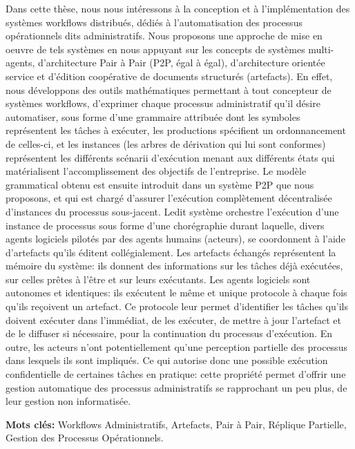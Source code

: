 \let\oldprintchaptertitle=\printchaptertitle
\renewcommand{\printchaptertitle}[1]{%
	\vspace*{-75pt}
	\oldprintchaptertitle{#1}
}%
\let\printchaptertitle=\oldprintchaptertitle
Dans cette thèse, nous nous intéressons à la conception et à l'implémentation des systèmes workflows distribués, dédiés à l'automatisation des processus opérationnels dits administratifs. Nous proposons une approche de mise en oeuvre de tels systèmes en nous appuyant sur les concepts de systèmes multi-agents, d'architecture Pair à Pair (P2P, égal à égal), d'architecture orientée service et d'édition coopérative de documents structurés (artefacts). 
En effet, nous développons des outils mathématiques permettant à tout concepteur de systèmes workflows, d'exprimer chaque processus administratif qu'il désire automatiser, sous forme d'une grammaire attribuée dont les symboles représentent les tâches à exécuter, les productions spécifient un ordonnancement de celles-ci, et les instances (les arbres de dérivation qui lui sont conformes) représentent les différents scénarii d'exécution menant aux différents états qui matérialisent l'accomplissement des objectifs de l'entreprise. Le modèle grammatical obtenu est ensuite introduit dans un système P2P que nous proposons, et qui est chargé d'assurer l'exécution complètement décentralisée d'instances du processus sous-jacent. 
Ledit système orchestre l'exécution d'une instance de processus sous forme d'une chorégraphie durant laquelle, divers agents logiciels pilotés par des agents humains (acteurs), se coordonnent à l'aide d'artefacts qu'ils éditent collégialement. Les artefacts échangés représentent la mémoire du système: ils donnent des informations sur les tâches déjà exécutées, sur celles prêtes à l'être et sur leurs exécutants. Les agents logiciels sont autonomes et identiques: ils exécutent le même et unique protocole à chaque fois qu'ils reçoivent un artefact. Ce protocole leur permet d'identifier les tâches qu'ils doivent exécuter dans l'immédiat, de les exécuter, de mettre à jour l'artefact et de le diffuser si nécessaire, pour la continuation du processus d'exécution. 
En outre, les acteurs n'ont potentiellement qu'une perception partielle des processus dans lesquels ils sont impliqués. Ce qui autorise donc une possible exécution confidentielle de certaines tâches en pratique: cette propriété permet d'offrir une gestion automatique des processus administratifs se rapprochant un peu plus, de leur gestion non informatisée.

\vspace{1cm}
\noindent\textbf{Mots clés:} Workflows Administratifs, Artefacts, Pair à Pair, Réplique Partielle, Gestion des Processus Opérationnels.

\myCleanStarChapterEnd

